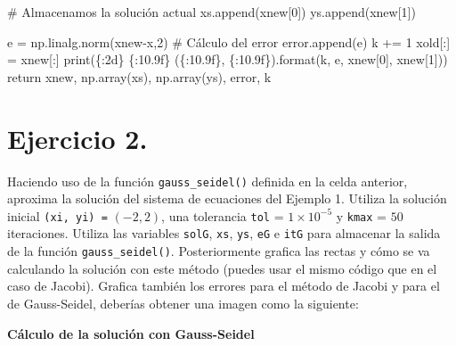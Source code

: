\documentclass[
  letterpaper,
  DIV=11,
  numbers=noendperiod]{scrreprt}
\newenvironment{Shaded}{\begin{snugshade}}{\end{snugshade}}
\newcommand{\BuiltInTok}[1]{\textcolor[rgb]{0.00,0.23,0.31}{#1}}
\newcommand{\CommentTok}[1]{\textcolor[rgb]{0.37,0.37,0.37}{#1}}
\newcommand{\ControlFlowTok}[1]{\textcolor[rgb]{0.00,0.23,0.31}{#1}}
\newcommand{\DecValTok}[1]{\textcolor[rgb]{0.68,0.00,0.00}{#1}}
\newcommand{\NormalTok}[1]{\textcolor[rgb]{0.00,0.23,0.31}{#1}}
\newcommand{\OperatorTok}[1]{\textcolor[rgb]{0.37,0.37,0.37}{#1}}
\newcommand{\SpecialCharTok}[1]{\textcolor[rgb]{0.37,0.37,0.37}{#1}}
\newcommand{\StringTok}[1]{\textcolor[rgb]{0.13,0.47,0.30}{#1}}
\begin{document}
\begin{Shaded}
\begin{Highlighting}[]
        \CommentTok{\# Almacenamos la solución actual}
\NormalTok{        xs.append(xnew[}\DecValTok{0}\NormalTok{])}
\NormalTok{        ys.append(xnew[}\DecValTok{1}\NormalTok{])}

\NormalTok{        e }\OperatorTok{=}\NormalTok{ np.linalg.norm(xnew}\OperatorTok{{-}}\NormalTok{x,}\DecValTok{2}\NormalTok{) }\CommentTok{\# Cálculo del error}
\NormalTok{        error.append(e)}
\NormalTok{        k }\OperatorTok{+=} \DecValTok{1}
\NormalTok{        xold[:] }\OperatorTok{=}\NormalTok{ xnew[:]}
        \BuiltInTok{print}\NormalTok{(}\StringTok{\textquotesingle{}}\SpecialCharTok{\{:2d\}}\StringTok{ }\SpecialCharTok{\{:10.9f\}}\StringTok{ (}\SpecialCharTok{\{:10.9f\}}\StringTok{, }\SpecialCharTok{\{:10.9f\}}\StringTok{)\textquotesingle{}}\NormalTok{.}\BuiltInTok{format}\NormalTok{(k, e, xnew[}\DecValTok{0}\NormalTok{], xnew[}\DecValTok{1}\NormalTok{]))}
    \ControlFlowTok{return}\NormalTok{ xnew, np.array(xs), np.array(ys), error, k}
\end{Highlighting}
\end{Shaded}

\section{\texorpdfstring{\textbf{Ejercicio
2.}}{Ejercicio 2.}}\label{ejercicio-2.}

Haciendo uso de la función \texttt{gauss\_seidel()} definida en la celda
anterior, aproxima la solución del sistema de ecuaciones del Ejemplo 1.
Utiliza la solución inicial \texttt{(xi,\ yi)\ =} \((-2, 2)\), una
tolerancia \texttt{tol} = \(1 \times 10^{-5}\) y \texttt{kmax} = \(50\)
iteraciones. Utiliza las variables \texttt{solG}, \texttt{xs},
\texttt{ys}, \texttt{eG} e \texttt{itG} para almacenar la salida de la
función \texttt{gauss\_seidel()}. Posteriormente grafica las rectas y
cómo se va calculando la solución con este método (puedes usar el mismo
código que en el caso de Jacobi). Grafica también los errores para el
método de Jacobi y para el de Gauss-Seidel, deberías obtener una imagen
como la siguiente:

\textbf{Cálculo de la solución con Gauss-Seidel}
\end{document}
